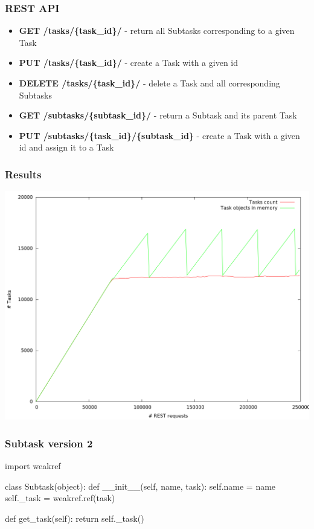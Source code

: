 \documentclass{beamer}
\begin{document}
    \begin{frame}
        \frametitle{REST API}
        \begin{itemize}
            \item \textbf{GET /tasks/\{task\_id\}/} - return all Subtasks corresponding to a given Task
            \item \textbf{PUT /tasks/\{task\_id\}/} - create a Task with a given id
            \item \textbf{DELETE /tasks/\{task\_id\}/} - delete a Task and all corresponding Subtasks
            \item \textbf{GET /subtasks/\{subtask\_id\}/} - return a Subtask and its parent Task
            \item \textbf{PUT /subtasks/\{task\_id\}/\{subtask\_id\}} - create a Task with a given id and assign it to a Task
        \end{itemize}
    \end{frame}

    \begin{frame}
        \frametitle{Results}
        \includegraphics[height=0.8\textheight]{gc_tasks.png}
    \end{frame}

    \begin{frame}[fragile]
        \frametitle{Subtask version 2}
        \begin{semiverbatim}
import weakref

class Subtask(object):
    def __init__(self, name, task):
        self.name = name
        \alert{self._task = weakref.ref(task)}

    def get_task(self):
        return self._task()

        \end{semiverbatim}
\end{frame}
\end{document}
